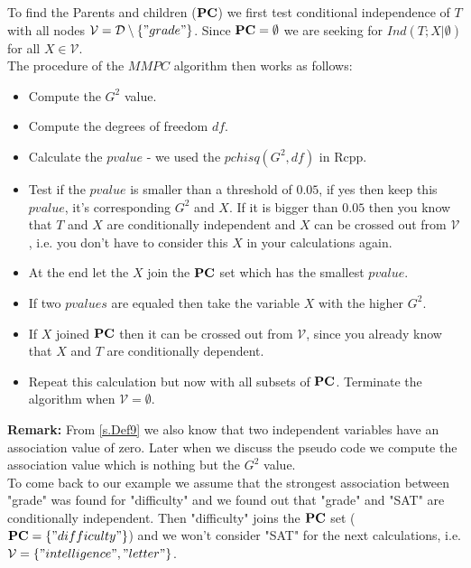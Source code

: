 			 \label{img.gradeSelected}

			To find the Parents and children (${\textbf{PC}}$) we first test conditional independence of $T$ with all nodes $\mathcal{V} = \mathcal{D} \setminus \{"grade"\}$. Since ${\textbf{PC}} = \emptyset$ we are seeking for $Ind(T; X | \emptyset)$ for all $X \in \mathcal{V}$.\\
			The procedure of the $MMPC$ algorithm then works as follows:

			\begin{itemize}
				\item Compute the $G^{2}$ value.
				\item Compute the degrees of freedom $df$.
				\item Calculate the $pvalue$ - we used the $pchisq(G^{2}, df)$ in Rcpp.
				\item Test if the $pvalue$ is smaller than a threshold of $0.05$, if yes then keep this $pvalue$, it's corresponding $G^{2}$ and $X$. If it is bigger than $0.05$ then you know that $T$ and $X$ are conditionally independent and $X$ can be crossed out from $\mathcal{V}$, i.e. you don't have to consider this $X$ in your calculations again.
				\item At the end let the $X$ join the ${\textbf{PC}}$ set which has the smallest $pvalue$.
				\item If two $pvalues$ are equaled then take the variable $X$ with the higher $G^{2}$.
				\item If $X$ joined ${\textbf{PC}}$ then it can be crossed out from $\mathcal{V}$, since you already know that $X$ and $T$ are conditionally dependent.
				\item Repeat this calculation but now with all subsets of ${\textbf{PC}}$. Terminate the algorithm when $\mathcal{V} = \emptyset$.
			\end{itemize}

			\textbf{Remark:} From \autoref{s.Def9} we also know that two independent variables have an association value of zero. Later when we discuss the pseudo code we compute the association value which is nothing but the $G^{2}$ value. \\

			To come back to our example we assume that the strongest association between "grade" was found for "difficulty" and we found out that "grade" and "SAT" are conditionally independent. Then "difficulty" joins the ${\textbf{PC}}$ set (${\textbf{PC}} = \{"difficulty"\}$) and we won't consider "SAT" for the next calculations, i.e. $\mathcal{V} = \{ "intelligence", "letter" \}$.


